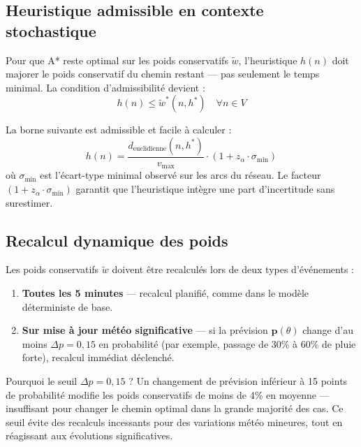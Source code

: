\documentclass[12pt,a4paper]{article}
\theoremstyle{definition}
\theoremstyle{remark}
\begin{document}
\subsection{Heuristique admissible en contexte stochastique}

Pour que A* reste optimal sur les poids conservatifs $\tilde{w}$,
l'heuristique $h(n)$ doit majorer le poids conservatif du chemin
restant — pas seulement le temps minimal. La condition d'admissibilité
devient :
\[
  h(n) \leq \tilde{w}^*(n, h^*) \quad \forall n \in V
\]

La borne suivante est admissible et facile à calculer :
\[
  h(n) = \frac{d_{\text{euclidienne}}(n, h^*)}{v_{\max}}
  \cdot (1 + z_\alpha \cdot \sigma_{\min})
\]
où $\sigma_{\min}$ est l'écart-type minimal observé sur les arcs du réseau.
Le facteur $(1 + z_\alpha \cdot \sigma_{\min})$ garantit que l'heuristique
intègre une part d'incertitude sans surestimer.

\subsection{Recalcul dynamique des poids}

Les poids conservatifs $\tilde{w}$ doivent être recalculés lors de
deux types d'événements :

\begin{enumerate}[leftmargin=2em, itemsep=4pt]
  \item \textbf{Toutes les 5 minutes} — recalcul planifié, comme dans
    le modèle déterministe de base.
  \item \textbf{Sur mise à jour météo significative} — si la prévision
    $\mathbf{p}(\theta)$ change d'au moins $\Delta p = 0{,}15$ en
    probabilité (par exemple, passage de 30\% à 60\% de pluie forte),
    recalcul immédiat déclenché.
\end{enumerate}

\begin{metierbox}{Pourquoi le seuil $\Delta p = 0{,}15$ ?}
Un changement de prévision inférieur à 15 points de probabilité
modifie les poids conservatifs de moins de 4\% en moyenne —
insuffisant pour changer le chemin optimal dans la grande majorité
des cas. Ce seuil évite des recalculs incessants pour des variations
météo mineures, tout en réagissant aux évolutions significatives.
\end{metierbox}

\newpage

\end{document}
